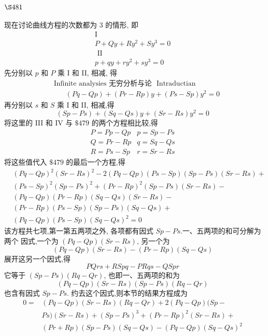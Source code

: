\section{$\S 481$}

现在讨论曲线方程的次数都为 3 的情形, 即
\[
\begin{gathered}
\mathrm{I} \\
P+Q y+R y^{2}+S y^{3}=0 \\
\text { II } \\
p+q y+r y^{2}+s y^{3}=0
\end{gathered}
\]
先分别以 $p$ 和 $P$ 乘 $\mathrm{I}$ 和 II, 相减, 得 
\[
\begin{aligned}
& \text { Infinite analysies 无穷分析与论 } \text { Intraductian } \\
& \qquad(P q-Q p)+(P r-R p) y+(P s-S p) y^{2}=0
\end{aligned}
\]
再分别以 $s$ 和 $S$ 乘 I 和 II, 相减,得
\[
(S p-P s)+(S q-Q s) y+(S r-R s) y^{2}=0
\]
将这里的 III 和 IV 与 $\$ 479$ 的两个方程相比较,得
\[
\begin{array}{l|l}
P=P p-Q p & p=S p-P s \\
Q=P r-R p & q=S q-Q s \\
R=P s-S p & r=S r-R s
\end{array}
\]
将这些值代入 $\$ 479$ 的最后一个方程,得
\[
\begin{aligned}
& (P q-Q p)^{2}(S r-R s)^{2}-2(P q-Q p)(P s-S p)(S p-P s)(S r-R s)+ \\
& (P s-S p)^{2}(S p-P s)^{2}+(P r-R p)^{2}(S p-P s)(S r-R s)- \\
& (P q-Q p)(P r-R p)(S q-Q s)(S r-R s)- \\
& (P r-R p)(P s-S p)(S p-P s)(S q-Q s)+ \\
& (P q-Q p)(P s-S p)(S q-Q s)^{2}=0
\end{aligned}
\]
该方程共七项,第一第五两项之外, 各项都有因式 $S p-P s$.一、五两项的和可分解为两个 因式,一个为 $(P q-Q p)(S r-R s)$, 另一个为
\[
(P q-Q p)(S r-R s)-(P r-R p)(S q-Q s)
\]
展开这另一个因式,得
\[
P Q r s+R S p q-P R q s-Q S p r
\]
它等于 $(S p-P s)(R q-Q r)$, 也即一、五两项的和为
\[
(P q-Q p)(S r-R s)(S p-P s)(R q-Q r)
\]
也含有因式 $S p-P s$. 约去这个因式,则本节的结果方程成为
\[
\begin{aligned}
0= & (P q-Q p)(S r-R s)(R q-Q r)+2(P q-Q p)(S p- \\
& P s)(S r-R s)+(S p-P s)^{3}+(P r-R p)^{2}(S r-R s)+ \\
& (P r+R p)(S p-P s)(S q-Q s)-(P q-Q p)(S q-Q s)^{2}
\end{aligned}
\]
